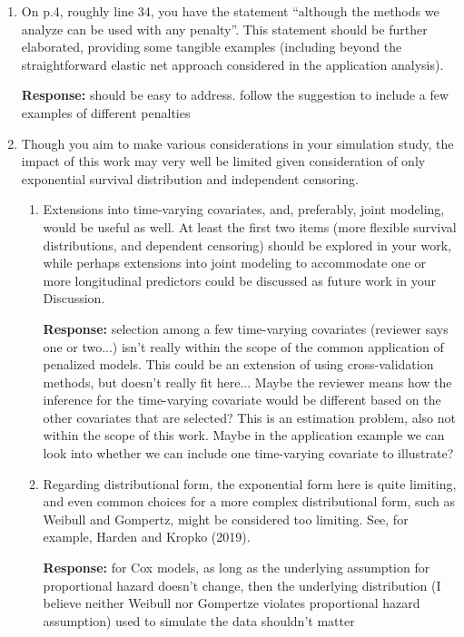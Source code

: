 \documentclass[12]{article}
\newcommand{\re}{\textbf{Response: }}
\newcommand\bd[1]{{\color{blue}#1}}
\begin{document}
\begin{enumerate}[align = left]
\item On p.4, roughly line 34, you have the statement “although the methods we analyze can be used with any penalty”.  This statement should be further elaborated, providing some tangible examples (including beyond the straightforward elastic net approach considered in the application analysis).

\re \bd{should be easy to address. follow the suggestion to include a few examples of different penalties}

\item Though you aim to make various considerations in your simulation study, the impact of this work may very well be limited given consideration of only exponential survival distribution and independent censoring. 
    \begin{enumerate}
        \item Extensions into time-varying covariates, and, preferably, joint modeling, would be useful as well. At least the first two items (more flexible survival distributions, and dependent censoring) should be explored in your work, while perhaps extensions into joint modeling to accommodate one or more longitudinal predictors could be discussed as future work in your Discussion.
        
        \re \bd{selection among a few time-varying covariates (reviewer says one or two...) isn't really within the scope of the common application of penalized models. This could be an extension of using cross-validation methods, but doesn't really fit here... Maybe the reviewer means how the inference for the time-varying covariate would be different based on the other covariates that are selected? This is an estimation problem, also not within the scope of this work. Maybe in the application example we can look into whether we can include one time-varying covariate to illustrate?}
        
        \item Regarding distributional form, the exponential form here is quite limiting, and even common choices for a more complex distributional form, such as Weibull and Gompertz, might be considered too limiting. See, for example, Harden and Kropko (2019).
        
        \re \bd{ for Cox models, as long as the underlying assumption for proportional hazard doesn't change, then the underlying distribution (I believe neither Weibull nor Gompertze violates proportional hazard assumption) used to simulate the data shouldn't matter}
        

\end{enumerate}
\end{enumerate}
\end{document}
